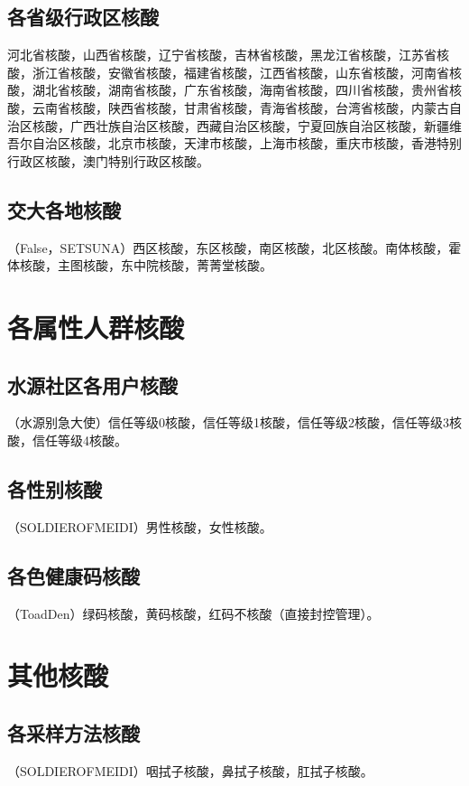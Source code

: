 \documentclass{ctexbook}
\begin{document}
\section{各省级行政区核酸}
河北省核酸，山西省核酸，辽宁省核酸，吉林省核酸，黑龙江省核酸，江苏省核酸，浙江省核酸，安徽省核酸，福建省核酸，江西省核酸，山东省核酸，河南省核酸，湖北省核酸，湖南省核酸，广东省核酸，海南省核酸，四川省核酸，贵州省核酸，云南省核酸，陕西省核酸，甘肃省核酸，青海省核酸，台湾省核酸，内蒙古自治区核酸，广西壮族自治区核酸，西藏自治区核酸，宁夏回族自治区核酸，新疆维吾尔自治区核酸，北京市核酸，天津市核酸，上海市核酸，重庆市核酸，香港特别行政区核酸，澳门特别行政区核酸。

\section{交大各地核酸}
（False，SETSUNA）西区核酸，东区核酸，南区核酸，北区核酸。南体核酸，霍体核酸，主图核酸，东中院核酸，菁菁堂核酸。

\chapter{各属性人群核酸}

\section{水源社区各用户核酸}
（水源别急大使）信任等级0核酸，信任等级1核酸，信任等级2核酸，信任等级3核酸，信任等级4核酸。

\section{各性别核酸}
（SOLDIEROFMEIDI）男性核酸，女性核酸。

\section{各色健康码核酸}
（ToadDen）绿码核酸，黄码核酸，红码不核酸（直接封控管理）。

\chapter{其他核酸}

\section{各采样方法核酸}
（SOLDIEROFMEIDI）咽拭子核酸，鼻拭子核酸，肛拭子核酸。
\end{document}
